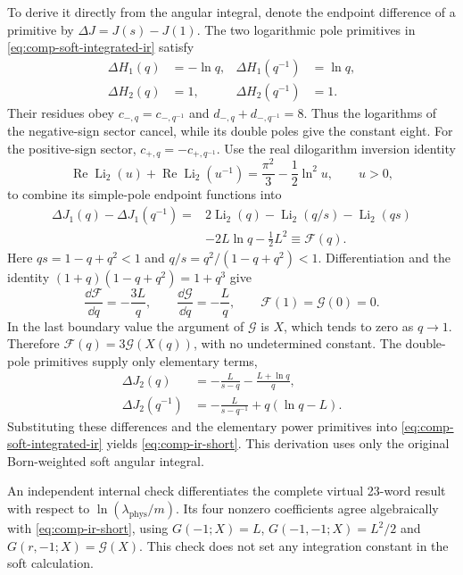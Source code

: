 To derive it directly from the angular integral, denote the endpoint
difference of a primitive by $\Delta J=J(s)-J(1)$.  The two logarithmic
pole primitives in \eqref{eq:comp-soft-integrated-ir} satisfy
\begin{align}
 \Delta H_1(q)&=-\ln q, & \Delta H_1(q^{-1})&=\ln q,\\
 \Delta H_2(q)&=1, & \Delta H_2(q^{-1})&=1.
\end{align}
Their residues obey $c_{-,q}=c_{-,q^{-1}}$ and
$d_{-,q}+d_{-,q^{-1}}=8$.  Thus the logarithms of the negative-sign
sector cancel, while its double poles give the constant eight.
For the positive-sign sector, $c_{+,q}=-c_{+,q^{-1}}$.
Use the real dilogarithm inversion identity
\begin{equation}
 \operatorname{Re}\operatorname{Li}_2(u)
 +\operatorname{Re}\operatorname{Li}_2(u^{-1})
 =\frac{\pi^2}{3}-\frac12\ln^2u,\qquad u>0,
\end{equation}
to combine its simple-pole endpoint functions into
\begin{equation}
 \begin{aligned}
 \Delta J_1(q)-\Delta J_1(q^{-1})
 ={}&2\operatorname{Li}_2(q)-\operatorname{Li}_2(q/s)
  -\operatorname{Li}_2(qs)\\
 &-2L\ln q-\frac12L^2\equiv\mathcal F(q).
 \end{aligned}
\end{equation}
Here $qs=1-q+q^2<1$ and $q/s=q^2/(1-q+q^2)<1$.
Differentiation and the identity
$(1+q)(1-q+q^2)=1+q^3$ give
\begin{equation}
 \frac{\dd\mathcal F}{\dd q}=-\frac{3L}{q},\qquad
 \frac{\dd\mathcal G}{\dd q}=-\frac{L}{q},\qquad
 \mathcal F(1)=\mathcal G(0)=0.
\end{equation}
In the last boundary value the argument of $\mathcal G$ is $X$,
which tends to zero as $q\to1$.  Therefore
$\mathcal F(q)=3\mathcal G(X(q))$, with no undetermined constant.
The double-pole primitives supply only elementary terms,
\begin{align}
 \Delta J_2(q)&=-\frac{L}{s-q}-\frac{L+\ln q}{q},\\
 \Delta J_2(q^{-1})&=-\frac{L}{s-q^{-1}}+q(\ln q-L).
\end{align}
Substituting these differences and the elementary power primitives
into \eqref{eq:comp-soft-integrated-ir} yields
\eqref{eq:comp-ir-short}.  This derivation uses only the original
Born-weighted soft angular integral.

An independent internal check differentiates the complete virtual
23-word result with respect to $\ln(\lambda_{\mathrm{phys}}/m)$.
Its four nonzero coefficients agree algebraically with
\eqref{eq:comp-ir-short}, using
$G(-1;X)=L$, $G(-1,-1;X)=L^2/2$ and
$G(r,-1;X)=\mathcal G(X)$.  This check does not set any integration
constant in the soft calculation.
